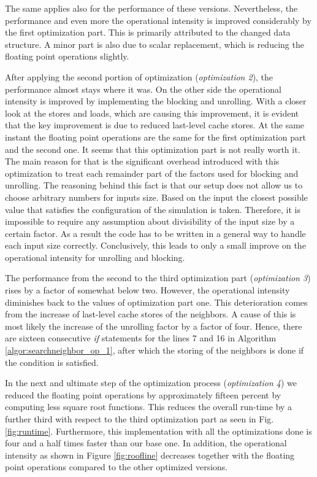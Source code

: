 \documentclass[letterpaper]{article}
\begin{document}
The same applies also for the performance of these versions.
Nevertheless, the performance and even more the operational intensity is improved considerably by the first optimization part. 
This is primarily attributed to the changed data structure. 
A minor part is also due to scalar replacement, which is reducing the floating point operations slightly.

After applying the second portion of optimization (\emph{optimization 2}), the performance almost stays where it was.
On the other side the operational intensity is improved by implementing the blocking and unrolling. 
With a closer look at the stores and loads, which are causing this improvement, it is evident that the key improvement is due to reduced last-level cache stores.
At the same instant the floating point operations are the same for the first optimization part and the second one. 
It seems that this optimization part is not really worth it.
The main reason for that is the significant overhead introduced with this optimization to treat each remainder part of the factors used for blocking and unrolling.
The reasoning behind this fact is that our setup does not allow us to choose arbitrary numbers for inputs size. Based on the input the closest possible value that satisfies the configuration of the simulation is taken.
Therefore, it is impossible to require any assumption about divisibility of the input size by a certain factor.
As a result the code has to be written in a general way to handle each input size correctly.
Conclusively, this leads to only a small improve on the operational intensity for unrolling and blocking.

The performance from the second to the third optimization part (\emph{optimization 3}) rises by a factor of somewhat below two.
However, the operational intensity diminishes back to the values of optimization part one.
This deterioration comes from the increase of last-level cache stores of the neighbors.
A cause of this is most likely the increase of the unrolling factor by a factor of four.
Hence, there are sixteen consecutive \emph{if} statements for the lines 7 and 16 in Algorithm \ref{algor:searchneighbor_op_1}, after which the storing of the neighbors is done if the condition is satisfied.

In the next and ultimate step of the optimization process (\emph{optimization 4}) we reduced the floating point operations by approximately fifteen percent by computing less square root functions. This reduces the overall run-time by a further third with respect to the third optimization part as seen in Fig. \ref{fig:runtime}. Furthermore, this implementation with all the optimizations done is four and a half times faster than our base one. 
In addition, the operational intensity as shown in Figure \ref{fig:roofline} decreases together with the floating point operations compared to the other optimized versions.
\end{document}
